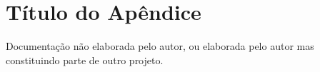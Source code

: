 \section{Título do Apêndice}

Documentação não elaborada pelo autor, ou elaborada pelo autor mas constituindo parte de outro projeto.